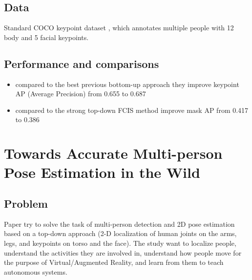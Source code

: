 \subsection{Data}
Standard COCO keypoint dataset \cite{coco2016} , which annotates multiple people with 12 body and 5 facial keypoints.

\subsection{Performance and comparisons}
\begin{itemize}
    \item compared to the best previous bottom-up approach they improve keypoint AP (Average Precision) from 0.655 to 0.687
    \item compared to the strong top-down FCIS method \cite{DBLP:journals/corr/LiQDJW16} improve mask AP from 0.417 to 0.386
\end{itemize}


\section{Towards Accurate Multi-person Pose Estimation in the Wild
\cite{DBLP:journals/corr/PapandreouZKTTB17}}

\subsection{Problem}
\par Paper try to solve the task of multi-person detection and 2D pose estimation based on a top-down approach (2-D localization of human joints on the arms, legs, and keypoints on torso and the face).
The study want to localize people, understand the activities they are involved in, understand how people move for the purpose of Virtual/Augmented Reality, and learn from them to teach autonomous systems.


